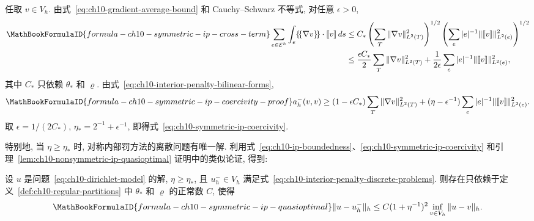 \begin{Proof}
任取 $v\in V_h$. 由式~\eqref{eq:ch10-gradient-average-bound} 和 Cauchy--Schwarz 不等式, 对任意 $\epsilon>0$,
\begin{align*}
\MathBookFormulaID{formula-ch10-symmetric-ip-cross-term}
\sum_{e\in\mathcal E^h}\int_e\{\!\{\nabla v\}\!\}\cdot[\![v]\!]\,ds
&\leq C_*\left(\sum_T\|\nabla v\|_{L^2(T)}^2\right)^{1/2}
\left(\sum_e|e|^{-1}\|[\![v]\!]\|_{L^2(e)}^2\right)^{1/2}\\
&\leq\frac{\epsilon C_*}{2}\sum_T\|\nabla v\|_{L^2(T)}^2
+\frac1{2\epsilon}\sum_e|e|^{-1}\|[\![v]\!]\|_{L^2(e)}^2,
\end{align*}
其中 $C_*$ 只依赖 $\theta_*$ 和 $\varrho$. 由式~\eqref{eq:ch10-interior-penalty-bilinear-forms},
\[
\MathBookFormulaID{formula-ch10-symmetric-ip-coercivity-proof}
a_h^-(v,v)\geq(1-\epsilon C_*)\sum_T\|\nabla v\|_{L^2(T)}^2
+(\eta-\epsilon^{-1})\sum_e|e|^{-1}\|[\![v]\!]\|_{L^2(e)}^2.
\]
取 $\epsilon=1/(2C_*)$, $\eta_*=2^{-1}+\epsilon^{-1}$, 即得式~\eqref{eq:ch10-symmetric-ip-coercivity}.
\end{Proof}

特别地, 当 $\eta\geq\eta_*$ 时, 对称内部罚方法的离散问题有唯一解. 利用式~\eqref{eq:ch10-ip-boundedness}、\eqref{eq:ch10-symmetric-ip-coercivity} 和引理~\ref{lem:ch10-nonsymmetric-ip-quasioptimal} 证明中的类似论证, 得到:

\begin{Lemma}
\label{lem:ch10-symmetric-ip-quasioptimal}
设 $u$ 是问题~\eqref{eq:ch10-dirichlet-model} 的解, $\eta\geq\eta_*$, 且 $u_h^-\in V_h$ 满足式~\eqref{eq:ch10-interior-penalty-discrete-problems}. 则存在只依赖于定义~\ref{def:ch10-regular-partitions} 中 $\theta_*$ 和 $\varrho$ 的正常数 $C$, 使得
\[
\MathBookFormulaID{formula-ch10-symmetric-ip-quasioptimal}
\|u-u_h^-\|_h\leq C(1+\eta^{-1})^2\inf_{v\in V_h}\|u-v\|_h.
\]
\end{Lemma}

